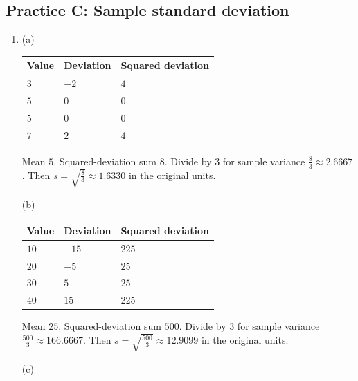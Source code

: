 \subsection*{Practice C: Sample standard deviation}
\begin{enumerate}[label=C\arabic*.,leftmargin=2.5em,itemsep=10pt]
\item \par\medskip\noindent\begin{minipage}{\linewidth}(a)\par{\small\renewcommand{\arraystretch}{1.2}\begin{tabularx}{\linewidth}{@{}YYY@{}}\toprule
Value & Deviation & Squared deviation\\\midrule
$3$ & $-2$ & $4$\\
$5$ & $0$ & $0$\\
$5$ & $0$ & $0$\\
$7$ & $2$ & $4$\\
\bottomrule\end{tabularx}}\par\medskip
Mean $5$. Squared-deviation sum $8$. Divide by 3 for sample variance $\frac{8}{3}\approx 2.6667$. Then $s=\sqrt{\frac{8}{3}}\approx 1.6330$ in the original units.\par\end{minipage}\par\medskip
\par\medskip\noindent\begin{minipage}{\linewidth}(b)\par{\small\renewcommand{\arraystretch}{1.2}\begin{tabularx}{\linewidth}{@{}YYY@{}}\toprule
Value & Deviation & Squared deviation\\\midrule
$10$ & $-15$ & $225$\\
$20$ & $-5$ & $25$\\
$30$ & $5$ & $25$\\
$40$ & $15$ & $225$\\
\bottomrule\end{tabularx}}\par\medskip
Mean $25$. Squared-deviation sum $500$. Divide by 3 for sample variance $\frac{500}{3}\approx 166.6667$. Then $s=\sqrt{\frac{500}{3}}\approx 12.9099$ in the original units.\par\end{minipage}\par\medskip
\par\medskip\noindent\begin{minipage}{\linewidth}(c)\par{\small\renewcommand{\arraystretch}{1.2}\begin{tabularx}{\linewidth}{@{}YYY@{}}\toprule

\end{tabularx}}
\end{minipage}
\end{enumerate}
